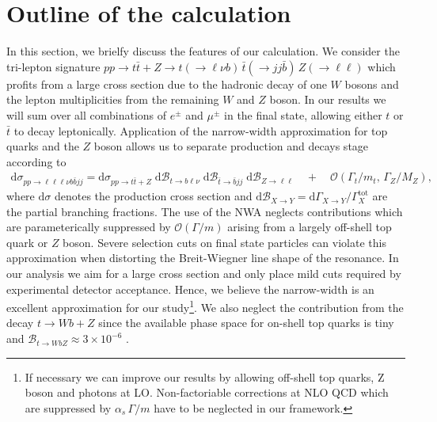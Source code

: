 \documentclass[preprint]{JHEP3} %
\newcommand{\mrm}{\mathrm}
\newcommand{\rd}{\mathrm{d}}
\newcommand{\Br}{\mathcal{B}}
\def\ttb{t\bar{t}}
\newcommand{\be}{\begin{eqnarray}}
\newcommand{\ee}{\end{eqnarray}}
\begin{document}
\section{Outline of the calculation}
In this section, we brielfy discuss the features of our calculation.
We consider the tri-lepton signature  
$pp \to \ttb + Z \to t(\to \ell \nu b) \, \bar{t} (\to jj \bar{b}) \, Z(\to \ell \ell)$
which profits from a large cross section due to the hadronic decay of one $W$ bosons and the lepton multiplicities from the remaining $W$ and $Z$ boson.
In our results we will sum over all combinations of $e^\pm$ and $\mu^\pm$ in the final state, allowing either $t$ or $\bar t$ to decay leptonically.
Application of the narrow-width approximation for top quarks and the $Z$ boson allows us to separate production and decays stage according to 
\be
 \rd \sigma_{pp\to\ell\ell\ell\nu b \bar{b} jj} = \rd \sigma_{pp\to\ttb+Z} \; \rd\Br_{t\to b \ell\nu} \; \rd\Br_{\bar{t} \to \bar{b} jj} \; \rd\Br_{Z\to \ell\ell}
 \quad+\quad \mathcal{O}(\Gamma_t/m_t, \, \Gamma_Z/M_Z)
, \label{Xsec}
\ee
where $\rd \sigma$ denotes the production cross section and $\rd\Br_{X\to Y}= \rd \Gamma_{X\to Y} \big/ \Gamma^\mrm{tot}_X$ are the partial branching fractions.
The use of the NWA neglects contributions which are parameterically suppressed by $\mathcal{O}(\Gamma / m)$ arising from a largely off-shell top quark or $Z$ boson.
Severe selection cuts on final state particles can violate this approximation when distorting the Breit-Wiegner line shape of the resonance.
In our analysis we aim for a large cross section and only place mild cuts required by experimental detector acceptance. 
Hence, we believe the narrow-width is an excellent approximation for our study\footnote{
If necessary we can improve our results by allowing off-shell top quarks, Z boson and photons at LO.
Non-factoriable corrections at NLO QCD which are suppressed by $\alpha_s \, \Gamma/m$ have to be neglected in our framework.
}.
We also neglect the contribution from the decay $t \to Wb+Z$ since the available phase space for on-shell top quarks is tiny and $\Br_{t\to W bZ } \approx 3 \times 10^{-6}$ \cite{see Baur}.
\end{document}
